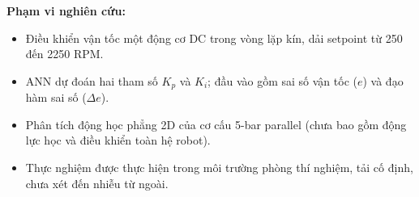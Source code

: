 \textbf{Phạm vi nghiên cứu:}
\begin{itemize}[leftmargin=1.5cm]
    \item Điều khiển vận tốc một động cơ DC trong vòng lặp kín, dải setpoint từ
    250 đến 2250 RPM.
    \item ANN dự đoán hai tham số $K_p$ và $K_i$; đầu vào gồm sai số vận tốc
    ($e$) và đạo hàm sai số ($\Delta e$).
    \item Phân tích động học phẳng 2D của cơ cấu 5-bar parallel (chưa bao gồm
    động lực học và điều khiển toàn hệ robot).
    \item Thực nghiệm được thực hiện trong môi trường phòng thí nghiệm, tải cố
    định, chưa xét đến nhiễu từ ngoài.
\end{itemize}
